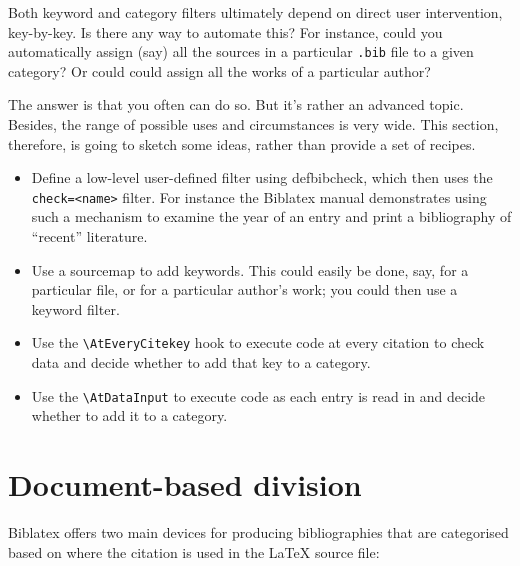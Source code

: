 Both keyword and category filters ultimately depend on direct user
intervention, key-by-key. Is there any way to automate this? For
instance, could you automatically assign (say) all the sources in a
particular \texttt{.bib} file to a given category? Or could could assign
all the works of a particular author?

The answer is that you often can do so. But it's rather an advanced
topic. Besides, the range of possible uses and circumstances is very
wide. This section, therefore, is going to sketch some ideas, rather
than provide a set of recipes.

\begin{itemize}
\item
  Define a low-level user-defined filter using defbibcheck, which then
  uses the \texttt{check=\textless{}name\textgreater{}} filter. For
  instance the Biblatex manual demonstrates using such a mechanism to
  examine the year of an entry and print a bibliography of ``recent''
  literature.
\item
  Use a sourcemap to add keywords. This could easily be done, say, for a
  particular file, or for a particular author's work; you could then use
  a keyword filter.
\item
  Use the \texttt{\textbackslash{}AtEveryCitekey} hook to execute code
  at every citation to check data and decide whether to add that key to
  a category.
\item
  Use the \texttt{\textbackslash{}AtDataInput} to execute code as each
  entry is read in and decide whether to add it to a category.
\end{itemize}

\section{Document-based division}

Biblatex offers two main devices for producing bibliographies that are
categorised based on where the citation is used in the LaTeX source
file:

